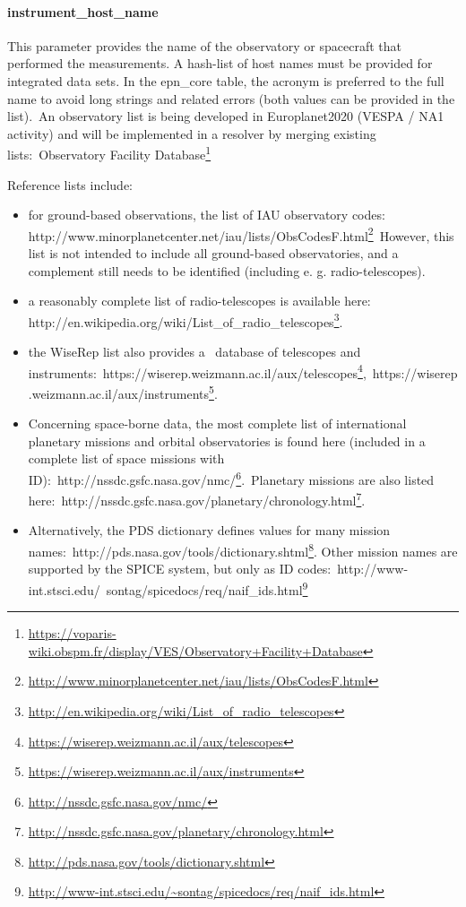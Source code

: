 \documentclass[11pt,a4paper]{ivoa}
\begin{document}
\paragraph{instrument\_host\_name}

This parameter provides the name of the observatory or spacecraft that performed the measurements. A hash-list of host names must be provided for integrated data sets. In the epn\_core table, the acronym is preferred to the full name to avoid long strings and related errors (both values can be provided in the list). An observatory list is being developed in Europlanet2020 (VESPA / NA1 activity) and will be implemented in a resolver by merging existing lists: Observatory Facility Database\footnote{\url{https://voparis-wiki.obspm.fr/display/VES/Observatory+Facility+Database}}

Reference lists include:

\begin{itemize}
\item for ground-based observations, the list of IAU observatory codes: http://www.minorplanetcenter.net/iau/lists/ObsCodesF.html\footnote{\url{http://www.minorplanetcenter.net/iau/lists/ObsCodesF.html}} However, this list is not intended to include all ground-based observatories, and a complement still needs to be identified (including e. g. radio-telescopes). 
\item a reasonably complete list of radio-telescopes is available here: http://en.wikipedia.org/wiki/List\_of\_radio\_telescopes\footnote{\url{http://en.wikipedia.org/wiki/List_of_radio_telescopes}}.
\item the WiseRep list also provides a  database of telescopes and instruments: https://wiserep.weizmann.ac.il/aux/telescopes\footnote{\url{https://wiserep.weizmann.ac.il/aux/telescopes}}, https://wiserep.weizmann.ac.il/aux/instruments\footnote{\url{https://wiserep.weizmann.ac.il/aux/instruments}}. 
\item Concerning space-borne data, the most complete list of international planetary missions and orbital observatories is found here (included in a complete list of space missions with ID): http://nssdc.gsfc.nasa.gov/nmc/\footnote{\url{http://nssdc.gsfc.nasa.gov/nmc/}}. Planetary missions are also listed here: http://nssdc.gsfc.nasa.gov/planetary/chronology.html\footnote{\url{http://nssdc.gsfc.nasa.gov/planetary/chronology.html}}. 
\item Alternatively, the PDS dictionary defines values for many mission names: http://pds.nasa.gov/tools/dictionary.shtml\footnote{\url{http://pds.nasa.gov/tools/dictionary.shtml}}. Other mission names are supported by the SPICE system, but only as ID codes: http://www-int.stsci.edu/~sontag/spicedocs/req/naif\_ids.html\footnote{\url{http://www-int.stsci.edu/~sontag/spicedocs/req/naif_ids.html}}
\end{itemize}
\end{document}
